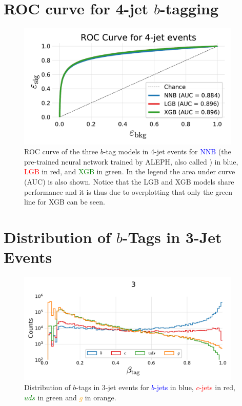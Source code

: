 \section[ROC curve for 4-jet b-tagging]{ROC curve for 4-jet $b$-tagging}
\begin{figure}
  \includegraphics[width=0.95\textwidth, trim=10 10 10 40, clip]{figures/quarks/ROC_4_jet-down_sample=1.00-ML_vars=vertex-selection=b-ejet_min=4-n_iter_RS_lgb=99-n_iter_RS_xgb=9-cdot_cut=0.90-version=19.pdf}
  \caption[ROC curve for 4-jet $b$-tagging]
          {ROC curve of the three $b$-tag models in 4-jet events for \textcolor{blue}{NNB} (the pre-trained neural network trained by ALEPH, also called ) in blue, \textcolor{red}{LGB} in red, and \textcolor{green}{XGB} in green. In the legend the area under curve (AUC) is also shown. Notice that the LGB and XGB models share performance and it is thus due to overplotting that only the green line for XGB can be seen.} 
\end{figure}
\clearpage


\FloatBarrier
\section[Distribution of b-Tags in 3-Jet Events]{Distribution of $b$-Tags in 3-Jet Events}
\begin{figure}[h!]
    \centerfloat
    \includegraphics[width=0.95\textwidth, trim=15 15 15 50, clip]{figures/quarks/btag_scores_histogram_-njet=3-down_sample=1.00-ML_vars=vertex-selection=b-ejet_min=4-n_iter_RS_lgb=99-n_iter_RS_xgb=9-cdot_cut=0.90-version=19.pdf}
    \caption[Distribution of $b$-Tags in 3-Jet Events]
            {Distribution of $b$-tags in 3-jet events for \textcolor{blue}{$b$-jets} in blue, \textcolor{red}{$c$-jets} in red, \textcolor{green}{$uds$} in green and \textcolor{orange}{$g$} in orange.} 
    \label{fig:q:btag_histogram_3j}
\end{figure}
\vspace{2cm}
